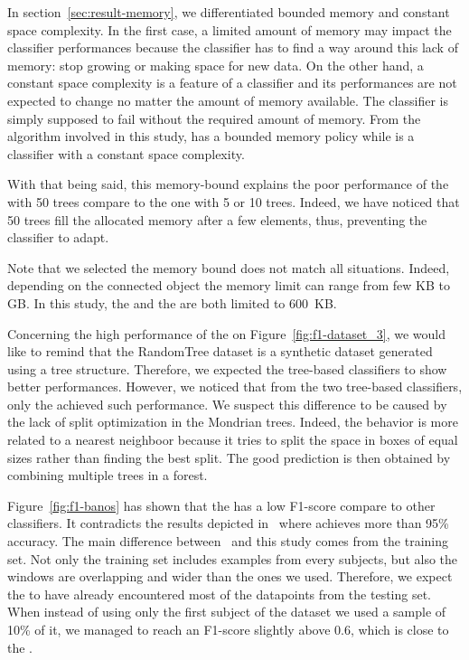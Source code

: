 In section~\ref{sec:result-memory}, we differentiated bounded memory and
constant space complexity. In the first case, a limited amount of memory
may impact the classifier performances because the classifier has to find a way
around this lack of memory: stop growing or making space for new data.
On the other hand, a constant space complexity is a feature of a classifier and
its performances are not expected to change no  matter the amount of memory
available. The classifier is simply supposed to fail without the required
amount of memory. From the algorithm involved in this study, \mondrianforest
has a bounded memory policy while \naivebayes is a classifier with a constant
space complexity.

With that being said, this memory-bound explains the poor performance of the
\mondrianforest with 50 trees compare to the one with 5 or 10 trees. Indeed, we
have noticed that 50 trees fill the allocated memory after a few elements,
thus, preventing the classifier to adapt.  

Note that we selected the memory bound does not match all situations. Indeed,
depending on the connected object the memory limit can range from few KB to GB.
In this study, the \mondrianforest and the \FNN are both limited to 600~KB.

Concerning the high performance of the \hoeffdingtree on
Figure~\ref{fig:f1-dataset_3}, we would like to remind that the RandomTree
dataset is a synthetic dataset generated using a tree structure. Therefore, we
expected the tree-based classifiers to show better performances.  However, we
noticed that from the two tree-based classifiers, only the \hoeffdingtree
achieved such performance.  We suspect this difference to be caused by the lack
of split optimization in the Mondrian trees. Indeed, the \mondrianforest behavior is
more related to a nearest neighboor because it tries to split the space in
boxes of equal sizes rather than finding the best split. The good prediction is
then obtained by combining multiple trees in a forest.

Figure~\ref{fig:f1-banos} has shown that the \FNN has a low
F1-score compare to other classifiers. It contradicts the results
depicted in~\cite{omid_2019} where \FNN achieves more than 95\% 
accuracy. The main difference between~\cite{omid_2019} and this study comes
from the training set. Not only the training set includes examples from every
subjects, but also the windows are overlapping and wider than the ones we used.
Therefore, we expect the \FNN to have already encountered
most of the datapoints from the testing set. When instead of using only the
first subject of the \banosdataset dataset we used a sample of 10\% of it, we
managed to reach an F1-score slightly above 0.6, which is close to the \naivebayes.

